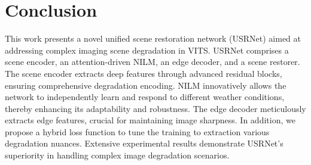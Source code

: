 \documentclass[final,12pt]{elsarticle}
\begin{document}
\section{Conclusion}\label{sec:conclusion}
%
    This work presents a novel unified scene restoration network (USRNet) aimed at addressing complex imaging scene degradation in VITS. USRNet comprises a scene encoder, an attention-driven NILM, an edge decoder, and a scene restorer. The scene encoder extracts deep features through advanced residual blocks, ensuring comprehensive degradation encoding. NILM innovatively allows the network to independently learn and respond to different weather conditions, thereby enhancing its adaptability and robustness. The edge decoder meticulously extracts edge features, crucial for maintaining image sharpness. In addition, we propose a hybrid loss function to tune the training to extraction various degradation nuances. Extensive experimental results demonstrate USRNet's superiority in handling complex image degradation scenarios.
%


%    

\footnotesize

\end{document}
